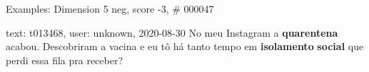 \begin{frame}{Examples: Dimension 5 neg, score -3, \# 000047}
\footnotesize
\begin{alertblock}{text: t013468, user: unknown, 2020-08-30}
No meu Instagram a \textbf{quarentena} acabou. Descobriram a vacina e eu tô há 
tanto tempo em \textbf{isolamento} \textbf{social} que perdi essa fila pra 
receber? 
\end{alertblock}
\end{frame}
